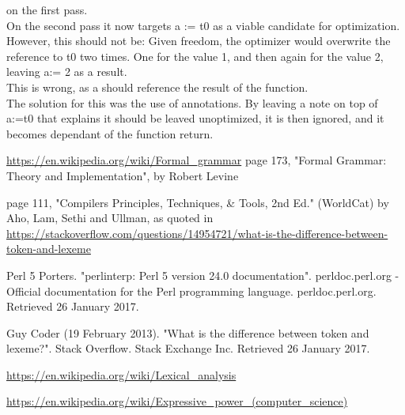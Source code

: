 \documentclass[twocolumn,10ptr]{article}
\begin{document}
	on the first pass. \\
	
	On the second pass it now targets a := t0 as a viable candidate for optimization.\\
	
	However, this should not be: Given freedom, the optimizer would overwrite the reference to t0 two times.
	One for the value 1, and then again for the value 2, leaving a:= 2 as a result.\\
	
	This is wrong, as a should reference the result of the function. \\
	
	The solution for this was the use of annotations. By leaving a note on top of a:=t0 that explains
	it should be leaved unoptimized, it is then ignored, and it becomes dependant of the function return.
	
	
	
	
	
	
	
	
	
	
	
	
	
	\onecolumn 
	\begin{thebibliography}{9}
		\url{https://en.wikipedia.org/wiki/Formal_grammar}
		page 173, "Formal Grammar: Theory and Implementation", by Robert Levine
		
		page 111, "Compilers Principles, Techniques, \& Tools, 2nd Ed." (WorldCat) by Aho, Lam, Sethi and Ullman, as quoted in \url{https://stackoverflow.com/questions/14954721/what-is-the-difference-between-token-and-lexeme}  
		
		Perl 5 Porters. "perlinterp: Perl 5 version 24.0 documentation". perldoc.perl.org - Official documentation for the Perl programming language. perldoc.perl.org. Retrieved 26 January 2017.
		
		Guy Coder (19 February 2013). "What is the difference between token and lexeme?". Stack Overflow. Stack Exchange Inc. Retrieved 26 January 2017.
		
		\url{https://en.wikipedia.org/wiki/Lexical_analysis}
		
		\url{https://en.wikipedia.org/wiki/Expressive_power_(computer_science)}
		
		
	\end{thebibliography}
	
	
	
	
	
\end{document}
